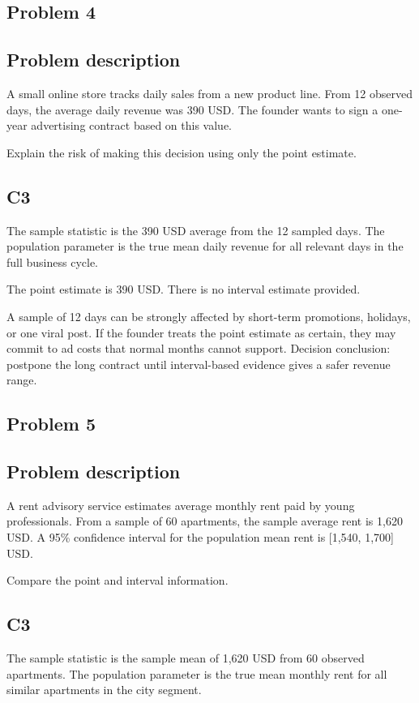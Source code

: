 \begin{ExamProblems}
		\newpage
		\item
		\subsection*{Problem 4}
		\subsection*{Problem description}
		A small online store tracks daily sales from a new product line.
		From 12 observed days, the average daily revenue was 390 USD.
		The founder wants to sign a one-year advertising contract based on this value.

		Explain the risk of making this decision using only the point estimate.

		\subsection*{C3}
		The sample statistic is the 390 USD average from the 12 sampled days.
		The population parameter is the true mean daily revenue for all relevant days in the full business cycle.

		The point estimate is 390 USD.
		There is no interval estimate provided.

		A sample of 12 days can be strongly affected by short-term promotions, holidays, or one viral post.
		If the founder treats the point estimate as certain, they may commit to ad costs that normal months cannot support.
		Decision conclusion: postpone the long contract until interval-based evidence gives a safer revenue range.

		\newpage
		\item
		\subsection*{Problem 5}
		\subsection*{Problem description}
		A rent advisory service estimates average monthly rent paid by young professionals.
		From a sample of 60 apartments, the sample average rent is 1,620 USD.
		A 95\% confidence interval for the population mean rent is [1,540, 1,700] USD.

		Compare the point and interval information.

		\subsection*{C3}
		The sample statistic is the sample mean of 1,620 USD from 60 observed apartments.
		The population parameter is the true mean monthly rent for all similar apartments in the city segment.


\end{ExamProblems}
